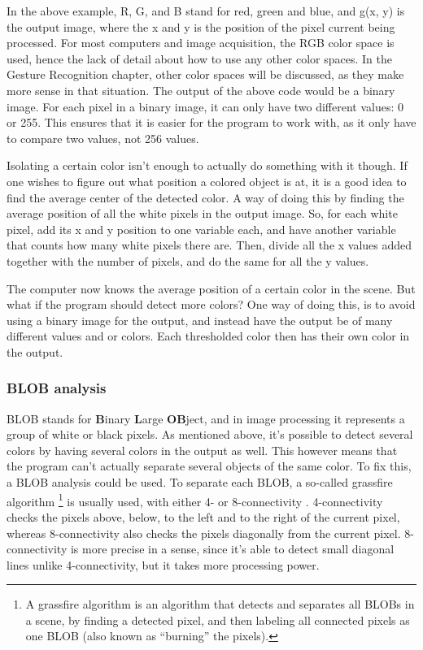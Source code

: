 In the above example, R, G, and B stand for red, green and blue, and g(x, y) is the output image, where the x and y is the position of the pixel current being processed. For most computers and image acquisition, the RGB color space is used, hence the lack of detail about how to use any other color spaces. In the Gesture Recognition chapter, other color spaces will be discussed, as they make more sense in that situation. The output of the above code would be a binary image. For each pixel in a binary image, it can only have two different values: 0 or 255. This ensures that it is easier for the program to work with, as it only have to compare two values, not 256 values.

Isolating a certain color isn’t enough to actually do something with it though. If one wishes to figure out what position a colored object is at, it is a good idea to find the average center of the detected color. A way of doing this by finding the average position of all the white pixels in the output image. So, for each white pixel, add its x and y position to one variable each, and have another variable that counts how many white pixels there are. Then, divide all the x values added together with the number of pixels, and do the same for all the y values.

The computer now knows the average position of a certain color in the scene. But what if the program should detect more colors? One way of doing this, is to avoid using a binary image for the output, and instead have the output be of many different values and or colors. Each thresholded color then has their own color in the output.

\subsubsection{BLOB analysis} \label{sec:blob}
BLOB stands for \textbf{B}inary \textbf{L}arge \textbf{OB}ject, and in image processing it represents a group of white or black pixels. As mentioned above, it’s possible to detect several colors by having several colors in the output as well. This however means that the program can’t actually separate several objects of the same color. To fix this, a BLOB analysis could be used. To separate each BLOB, a so-called grassfire algorithm 
\footnote{A grassfire algorithm is an algorithm that detects and separates all BLOBs in a scene, by finding a detected pixel, and then labeling all connected pixels as one BLOB (also known as “burning” the pixels).} 
is usually used, with either 4- or 8-connectivity \parencite{Moeslund2012}. 4-connectivity checks the pixels above, below, to the left and to the right of the current pixel, whereas 8-connectivity also checks the pixels diagonally from the current pixel. 8-connectivity is more precise in a sense, since it’s able to detect small diagonal lines unlike 4-connectivity, but it takes more processing power.
\bigskip

